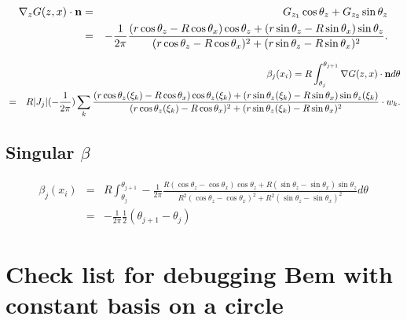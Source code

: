 \begin{eqnarray}
\nabla_z G(z, x) \cdot {\bf n} &=& G_{z_1} \cos\theta_z + G_{z_2} \sin\theta_z\\
&=&-\frac{1}{2\pi}\frac{(r\cos\theta_z-R\cos\theta_x)\cos\theta_z+(r\sin\theta_z-R\sin\theta_x)\sin\theta_z}{(r\cos\theta_z-R\cos\theta_x)^2+(r\sin\theta_z- R\sin\theta_x)^2}.
\end{eqnarray}

\begin{eqnarray}
&&\beta_j(x_i) = R \int_{\theta_j}^{\theta_{j+1}} \nabla G(z,x)\cdot {\bf n} d\theta \\
&=& R |J_j| (-\frac{1}{2\pi}) \sum_k\frac{(r\cos\theta_z(\xi_k)-R\cos\theta_x)\cos\theta_z(\xi_k)+(r\sin\theta_z(\xi_k)-R\sin\theta_x)\sin\theta_z(\xi_k)}{(r\cos\theta_z(\xi_k)-R\cos\theta_x)^2+(r\sin\theta_z(\xi_k)-R\sin\theta_x)^2} \cdot w_k.
\end{eqnarray}

\subsection{Singular $\beta$}
\begin{eqnarray}
\beta_j(x_i) &=& R \int_{\theta_j}^{\theta_{j+1}} -\frac{1}{2\pi}\frac{R(\cos\theta_z-\cos\theta_x)\cos\theta_z+R(\sin\theta_z-\sin\theta_x)\sin\theta_z}{R^2(\cos\theta_z-\cos\theta_x)^2+R^2(\sin\theta_z-\sin\theta_x)^2}d\theta\\
&=&-\frac{1}{2\pi} \frac{1}{2} (\theta_{j+1} - \theta_j)
\end{eqnarray}

\section{Check list for debugging Bem with constant basis on a
circle}

